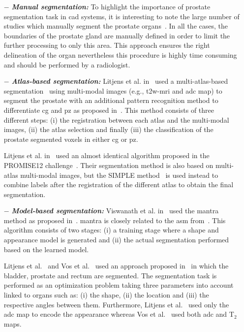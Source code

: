 \begin{enumerate}[leftmargin=*]

\item[$-$] \textbf{\textit{Manual segmentation:}} To highlight the importance of prostate segmentation task in \ac{cad} systems, it is interesting to note the large number of studies which manually segment the prostate organs~\cite{Artan2009,Artan2010,Matulewicz2013,Niaf2011,Niaf2012,Ozer2009,Ozer2010,Puech2009,Vos2008,Vos2008a}. In all the cases, the boundaries of the prostate gland are manually defined in order to limit the further processing to only this area. This approach ensures the right delineation of the organ nevertheless this procedure is highly time consuming and should be performed by a radiologist.

\item[$-$] \textbf{\textit{Atlas-based segmentation:}} Litjens et al. in~\cite{Litjens2012} used a multi-atlas-based segmentation~\cite{Klein2008} using multi-modal images (e.g., \ac{t2w}-\ac{mri} and \ac{adc} map) to segment the prostate with an additional pattern recognition method to differentiate \ac{cg} and \ac{pz} as proposed in~\cite{Litjens2012a}. This method consists of three different steps: (i) the registration between each atlas and the multi-modal images, (ii) the atlas selection and finally (iii) the classification of the prostate segmented voxels in either \ac{cg} or \ac{pz}. 

  Litjens et al. in~\cite{Litjens2014} used an almost identical algorithm proposed in the PROMISE12 challenge~\cite{Litjens2014a}. Their segmentation method is also based on multi-atlas multi-modal images, but the SIMPLE method~\cite{Langerak2010} is used instead to combine labels after the registration of the different atlas to obtain the final segmentation.

\item[$-$] \textbf{\textit{Model-based segmentation:}} Viswanath et al. in~\cite{Viswanath2008a,Viswanath2009} used the \ac{mantra} method as proposed in~\cite{Toth2008}. \ac{mantra} is closely related to the \ac{asm} from~\cite{Cootes1995}. This algorithm consists of two stages: (i) a training stage where a shape and appearance model is generated and (ii) the actual segmentation performed based on the learned model. 

  Litjens et al.~\cite{Litjens2011} and Vos et al.~\cite{Vos2012} used an approach proposed in~\cite{Huisman2010} in which the bladder, prostate and rectum are segmented. The segmentation task is performed as an optimization problem taking three parameters into account linked to organs such as: (i) the shape, (ii) the location and (iii) the respective angles between them. Furthermore, Litjens et al.~\cite{Litjens2011} used only the \ac{adc} map to encode the appearance whereas Vos et al.~\cite{Vos2012} used both \ac{adc} and T$_2$ maps.

\end{enumerate}

